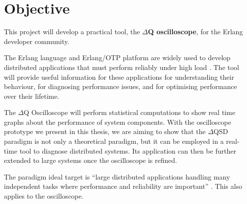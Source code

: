 \section{Objective}
         This project will develop a practical tool, the \textbf{$\Delta$Q oscilloscope}, for the Erlang developer community. 
    
    The Erlang language and Erlang/OTP platform are widely used to develop distributed applications that must perform reliably under high load \cite{erl}. The tool will provide useful information for these applications for understanding their behaviour, for diagnosing performance issues, and for optimising performance over their lifetime. \cite{post}

    The $\Delta$Q Oscilloscope will perform statistical computations to show real time graphs about the performance of system components. With the oscilloscope prototype we present in this thesis, we are aiming to show that the $\Delta$QSD paradigm is not only a theoretical paradigm, but it can be employed in a real-time tool to diagnose distributed systems. Its application can then be further extended to large systems once the oscilloscope is refined.

    The paradigm ideal target is ``large distributed applications handling many independent tasks where performance and reliability are important'' \cite{dq-tut}. This also applies to the oscilloscope.
    

